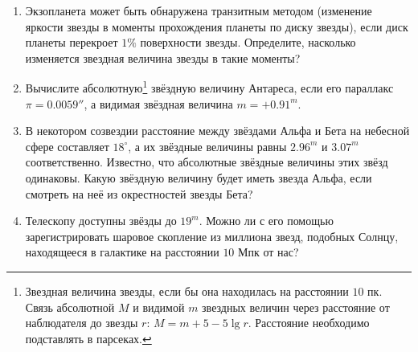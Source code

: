 \documentclass[12pt]{article}
\begin{document}
\begin{enumerate}
        \item Экзопланета может быть обнаружена транзитным методом (изменение яркости звезды в моменты прохождения планеты по диску звезды), если диск планеты перекроет $1\%$ поверхности звезды. Определите, насколько изменяется звездная величина звезды в такие моменты?

        \item Вычислите абсолютную\footnote{Звездная величина звезды, если бы она находилась на расстоянии $10$ пк. Связь абсолютной $M$ и видимой $m$ звездных величин через расстояние от наблюдателя до звезды $r$: $M = m +5 - 5\lg{r}$. Расстояние необходимо подставлять в парсеках.} звёздную величину Антареса, если его параллакс $\pi = 0.0059''$, а видимая звёздная величина $m = + 0.91^{m}$.

        \item В некотором созвездии расстояние между звёздами Альфа и Бета на небесной сфере составляет $18^{\circ}$, а их звёздные величины равны $2.96^m$ и $3.07^m$ соответственно. Известно, что абсолютные звёздные величины этих звёзд одинаковы. Какую звёздную величину будет иметь звезда Альфа, если смотреть на неё из окрестностей звезды Бета?

        \item Телескопу доступны звёзды до $19^m$. Можно ли с его помощью зарегистрировать шаровое скопление из миллиона звезд, подобных Солнцу, находящееся в галактике на расстоянии $10$ Мпк от нас?
 \end{enumerate}
\end{document}
